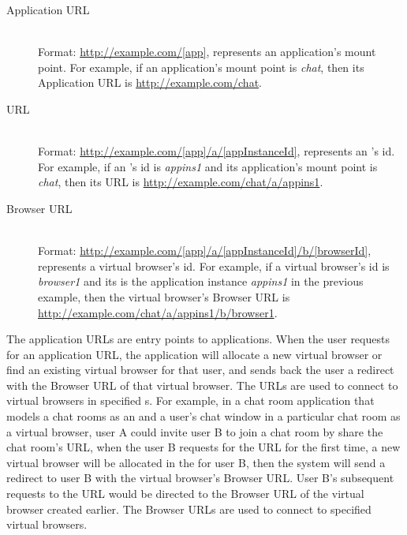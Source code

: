 \begin{description}

\item[Application URL] \label{itm:appurl} \hfill \\
Format: \url{http://example.com/[app]}, \code{[app]} represents an
application's mount point.   For example, if an application's mount point is
\emph{chat},  then its Application URL is \url{http://example.com/chat}.


\item[\appins{} URL] \label{itm:appinsurl} \hfill \\
Format: \url{http://example.com/[app]/a/[appInstanceId]},
\code{[appInstanceId]} represents an \appins{}'s id.  For example, if an
\appins{}'s id is \emph{appins1} and its application's mount point is
\emph{chat}, then its \appins{} URL is
\url{http://example.com/chat/a/appins1}.


\item[Browser URL] \label{itm:vburl} \hfill \\
Format: \url{http://example.com/[app]/a/[appInstanceId]/b/[browserId]},
\code{[browserId]} represents a virtual browser's id. For example, if a
virtual browser's id is \emph{browser1} and its \appins{} is the application
instance \emph{appins1} in the previous example, then the virtual browser's
Browser URL is \url{http://example.com/chat/a/appins1/b/browser1}.

\end{description}

The application URLs are entry points to applications. When the user requests
for an application URL, the application will allocate a new virtual browser or
find an existing virtual browser for that user, and sends back the user a
redirect with the Browser URL of that virtual browser. The \appins URLs are
used to connect to virtual browsers in specified \appins{}s. For example, in a
chat room application that models a chat rooms as an \appins{} and a user's
chat window in a particular chat room  as a virtual browser, user A could
invite user B to join a chat room by share the chat room's \appins URL, when
the user B requests for the \appins URL for the first time, a new virtual
browser will be allocated in the \appins for user B, then the system will send
a redirect to user B with the virtual browser's Browser URL. User B's
subsequent requests to the \appins URL would be directed to the Browser URL of
the virtual browser created earlier. The Browser URLs are used to connect to
specified virtual browsers.


